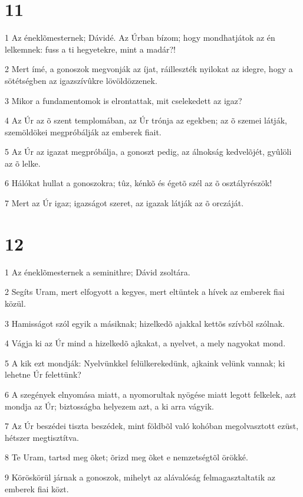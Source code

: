 \chapter{11}

\par 1 Az éneklõmesternek; Dávidé. Az Úrban bízom; hogy mondhatjátok az én lelkemnek: fuss a ti hegyetekre, mint a madár?!
\par 2 Mert ímé, a gonoszok megvonják az íjat, ráilleszték nyilokat az idegre, hogy a sötétségben az igazszívûkre lövöldözzenek.
\par 3 Mikor a fundamentomok is elrontattak, mit cselekedett az igaz?
\par 4 Az Úr az õ szent templomában, az Úr trónja az egekben; az õ szemei látják, szemöldökei megpróbálják az emberek fiait.
\par 5 Az Úr az igazat megpróbálja, a gonoszt pedig, az álnokság kedvelõjét, gyûlöli az õ lelke.
\par 6 Hálókat hullat a gonoszokra; tûz, kénkõ és égetõ szél az õ osztályrészök!
\par 7 Mert az Úr igaz; igazságot szeret, az igazak látják az õ orczáját.

\chapter{12}

\par 1 Az éneklõmesternek a seminithre; Dávid zsoltára.
\par 2 Segíts Uram, mert elfogyott a kegyes, mert eltüntek a hívek az emberek fiai közül.
\par 3 Hamisságot szól egyik a másiknak; hizelkedõ ajakkal kettõs szívbõl szólnak.
\par 4 Vágja ki az Úr mind a hizelkedõ ajkakat, a nyelvet, a mely nagyokat mond.
\par 5 A kik ezt mondják: Nyelvünkkel felülkerekedünk, ajkaink velünk vannak; ki lehetne Úr felettünk?
\par 6 A szegények elnyomása miatt, a nyomorultak nyögése miatt legott felkelek, azt mondja az Úr; biztosságba helyezem azt, a ki arra vágyik.
\par 7 Az Úr beszédei tiszta beszédek, mint földbõl való kohóban megolvasztott ezüst, hétszer megtisztítva.
\par 8 Te Uram, tartsd meg õket; õrizd meg õket e nemzetségtõl örökké.
\par 9 Köröskörül járnak a gonoszok, mihelyt az alávalóság felmagasztaltatik az emberek fiai közt.

